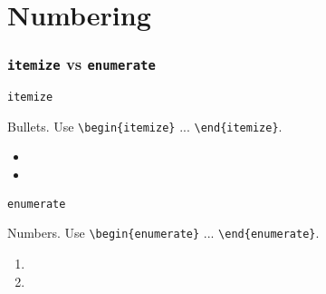\documentclass{beamer}
\begin{document}
\section{Numbering}
\begin{frame}[fragile]
  \frametitle{\texttt{itemize} vs \texttt{enumerate}}

  \texttt{itemize}

  Bullets. Use \verb|\begin{itemize}| ... \verb|\end{itemize}|.

  \begin{itemize}
    \item
    \item 
  \end{itemize}

  \vspace{\baselineskip}

  \texttt{enumerate}

  Numbers. Use \verb|\begin{enumerate}| ... \verb|\end{enumerate}|.

  \begin{enumerate}
    \item
    \item 
  \end{enumerate}

\end{frame}

\end{document}
